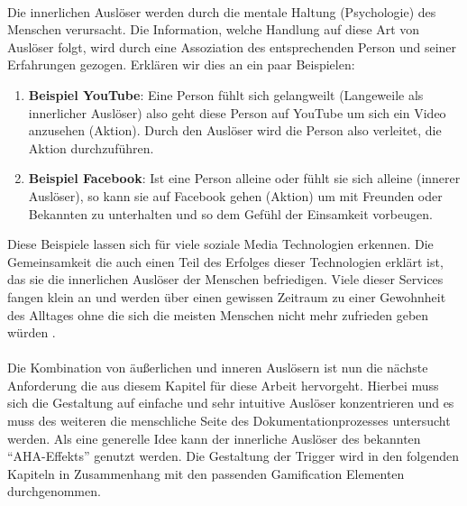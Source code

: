\documentclass[a4paper,12pt]{scrartcl}
\begin{document}
\\
Die innerlichen Auslöser werden durch die mentale Haltung (Psychologie) des Menschen verursacht. Die Information, welche Handlung auf diese Art von Auslöser folgt, wird durch eine Assoziation des entsprechenden Person und seiner Erfahrungen gezogen. Erklären wir dies an ein paar Beispielen:
\begin{enumerate}
      \item \textbf{Beispiel YouTube}: Eine Person fühlt sich gelangweilt (Langeweile als innerlicher Auslöser) also geht diese Person auf YouTube um sich ein Video anzusehen (Aktion). Durch den Auslöser wird die Person also verleitet, die Aktion durchzuführen. 
      \item \textbf{Beispiel Facebook}: Ist eine Person alleine oder fühlt sie sich alleine (innerer Auslöser), so kann sie auf Facebook gehen (Aktion) um mit Freunden oder Bekannten zu unterhalten und so dem Gefühl der Einsamkeit vorbeugen.
\end{enumerate}
Diese Beispiele lassen sich für viele soziale Media Technologien erkennen. Die Gemeinsamkeit die auch einen Teil des Erfolges dieser Technologien erklärt ist, das sie die innerlichen Auslöser der Menschen befriedigen. Viele dieser Services fangen klein an und werden über einen gewissen Zeitraum zu einer Gewohnheit des Alltages ohne die sich die meisten Menschen nicht mehr zufrieden geben würden \cite{Eyal2014}.
\\\\
Die Kombination von äußerlichen und inneren Auslösern ist nun die nächste Anforderung die aus diesem Kapitel für diese Arbeit hervorgeht. Hierbei muss sich die Gestaltung auf einfache und sehr intuitive Auslöser konzentrieren und es muss des weiteren die menschliche Seite des Dokumentationprozesses untersucht werden. Als eine generelle Idee kann der innerliche Auslöser des bekannten \enquote{AHA-Effekts} genutzt werden. Die Gestaltung der Trigger wird in den folgenden Kapiteln in Zusammenhang mit den passenden Gamification Elementen durchgenommen.  
\end{document}
